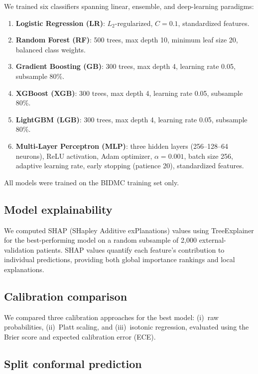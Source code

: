 \documentclass[12pt]{article}
\begin{document}
We trained six classifiers spanning linear, ensemble, and
deep-learning paradigms:
\begin{enumerate}
\item \textbf{Logistic Regression (LR)}: $L_2$-regularized,
$C = 0.1$, standardized features.
\item \textbf{Random Forest (RF)}: 500 trees, max depth 10,
minimum leaf size 20, balanced class weights.
\item \textbf{Gradient Boosting (GB)}: 300 trees, max depth 4,
learning rate 0.05, subsample 80\%.
\item \textbf{XGBoost (XGB)}: 300 trees, max depth 4, learning
rate 0.05, subsample 80\%.\cite{chen2016xgboost}
\item \textbf{LightGBM (LGB)}: 300 trees, max depth 4, learning
rate 0.05, subsample 80\%.\cite{ke2017lightgbm}
\item \textbf{Multi-Layer Perceptron (MLP)}: three hidden layers
(256--128--64 neurons), ReLU activation, Adam optimizer,
$\alpha = 0.001$, batch size 256, adaptive learning rate,
early stopping (patience 20), standardized features.
\end{enumerate}

All models were trained on the BIDMC training set only.

\subsection{Model explainability}
\label{sec:shap}

We computed SHAP (SHapley Additive exPlanations)
values\cite{lundberg2017unified} using TreeExplainer for the
best-performing model on a random subsample of 2{,}000
external-validation patients.  SHAP values quantify each
feature's contribution to individual predictions, providing both
global importance rankings and local explanations.

\subsection{Calibration comparison}
\label{sec:calibration}

We compared three calibration approaches for the best model:
(i)~raw probabilities, (ii)~Platt
scaling,\cite{platt1999probabilistic} and (iii)~isotonic
regression,\cite{zadrozny2002transforming} evaluated using the
Brier score and expected calibration error (ECE).

\subsection{Split conformal prediction}
\label{sec:conformal}
\end{document}
